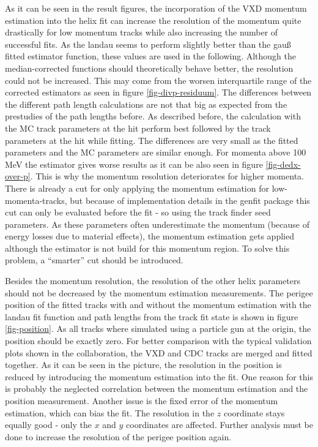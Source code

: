 As it can be seen in the result figures, the incorporation of the VXD momentum estimation into the helix fit can increase the resolution of the momentum quite drastically for low momentum tracks while also increasing the number of successful fits. As the landau seems to perform slightly better than the gauß fitted estimator function, these values are used in the following. Although the median-corrected functions should theoretically behave better, the resolution could not be increased. This may come from the worsen interquartile range of the corrected estimators as seen in figure \ref{fig-divp-residuum}. The differences between the different path length calculations are not that big as expected from the prestudies of the path lengths before. As described before, the calculation with the MC track parameters at the hit perform best followed by the track parameters at the hit while fitting. The differences are very small as the fitted parameters and the MC parameters are similar enough. For momenta above 100 MeV the estimator gives worse results as it can be also seen in figure \ref{fig-dedx-over-p}. This is why the momentum resolution deteriorates for higher momenta. There is already a cut for only applying the momentum estimation for low-momenta-tracks, but because of implementation details in the genfit package this cut can only be evaluated before the fit - so using the track finder seed parameters. As these parameters often underestimate the momentum (because of energy losses due to material effects), the momentum estimation gets applied although the estimator is not build for this momentum region. To solve this problem, a ``smarter'' cut should be introduced.

Besides the momentum resolution, the resolution of the other helix parameters should not be decreased by the momentum estimation measurements. The perigee position of the fitted tracks with and without the momentum estimation with the landau fit function and path lengths from the track fit state is shown in figure \ref{fig-position}. As all tracks where simulated using a particle gun at the origin, the position should be exactly zero. For better comparison with the typical validation plots shown in the collaboration, the VXD and CDC tracks are merged and fitted together. As it can be seen in the picture, the resolution in the position is reduced by introducing the momentum estimation into the fit. One reason for this is probably the neglected correlation between the momentum estimation and the position measurement. Another issue is the fixed error of the momentum estimation, which can bias the fit. The resolution in the $z$ coordinate stays equally good - only the $x$ and $y$ coordinates are affected. Further analysis must be done to increase the resolution of the perigee position again.

